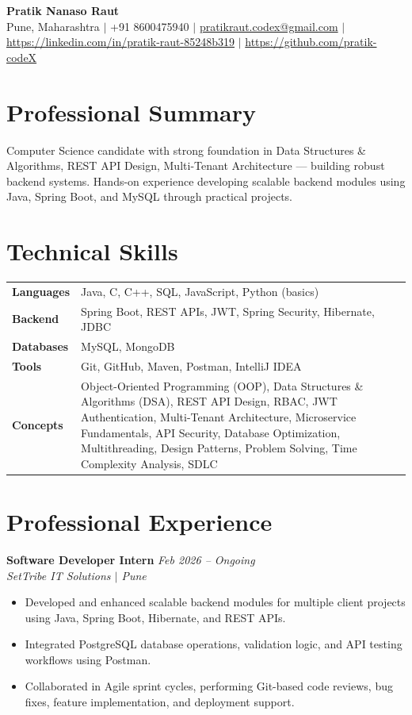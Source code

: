 \documentclass[10.5pt,a4paper]{article}
\begin{document}
\begin{center}
{\Large\bfseries Pratik Nanaso Raut}\\[2pt]
Pune, Maharashtra $|$ +91 8600475940 $|$ \href{mailto:pratikraut.codex@gmail.com}{pratikraut.codex@gmail.com} $|$ \href{https://linkedin.com/in/pratik-raut-85248b319}{https://linkedin.com/in/pratik-raut-85248b319} $|$ \href{https://github.com/pratik-codeX}{https://github.com/pratik-codeX}
\end{center}
\vspace{-2pt}
\section{Professional Summary}
Computer Science candidate with strong foundation in Data Structures \& Algorithms, REST API Design, Multi-Tenant Architecture — building robust backend systems. Hands-on experience developing scalable backend modules using Java, Spring Boot, and MySQL through practical projects.
\section{Technical Skills}
\begin{tabular}{@{}p{}p{}@{}}
\textbf{Languages} & Java, C, C++, SQL, JavaScript, Python (basics) \\[1pt]
\textbf{Backend} & Spring Boot, REST APIs, JWT, Spring Security, Hibernate, JDBC \\[1pt]
\textbf{Databases} & MySQL, MongoDB \\[1pt]
\textbf{Tools} & Git, GitHub, Maven, Postman, IntelliJ IDEA \\[1pt]
\textbf{Concepts} & Object-Oriented Programming (OOP), Data Structures \& Algorithms (DSA), REST API Design, RBAC, JWT Authentication, Multi-Tenant Architecture, Microservice Fundamentals, API Security, Database Optimization, Multithreading, Design Patterns, Problem Solving, Time Complexity Analysis, SDLC \\
\end{tabular}
\section{Professional Experience}
\textbf{Software Developer Intern} \hfill \textit{Feb 2026 -- Ongoing}
\\\textit{SetTribe IT Solutions $|$ Pune}
\begin{itemize}
  \item Developed and enhanced scalable backend modules for multiple client projects using Java, Spring Boot, Hibernate, and REST APIs.
  \item Integrated PostgreSQL database operations, validation logic, and API testing workflows using Postman.
  \item Collaborated in Agile sprint cycles, performing Git-based code reviews, bug fixes, feature implementation, and deployment support.
\end{itemize}
\end{document}
